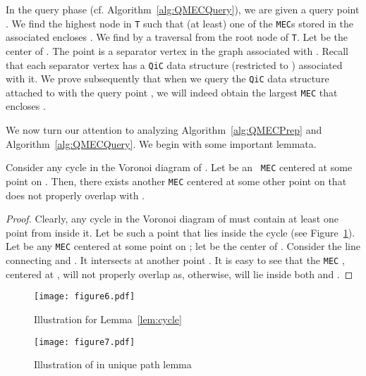 \documentclass[12pt]{llncs}
\begin{document}
In the query phase (cf. Algorithm\ \ref{alg:QMECQuery}), we are given a query point . We find the highest node  in {\tt T} such that (at least) one of the {\tt MEC}s  stored in the associated  encloses . We find  by a traversal from the root node of {\tt T}. Let  be the center of . The point  is a separator vertex in the graph  associated with . Recall that each separator vertex has a {\tt QiC} data structure (restricted to ) associated with it. We prove subsequently that when we query the {\tt QiC} data structure attached to  with the query point , we will indeed obtain the largest {\tt MEC}  that encloses . 

We now turn our attention to analyzing Algorithm\ \ref{alg:QMECPrep} and Algorithm\ \ref{alg:QMECQuery}. We begin with some important lemmata.

\begin{lemma}\label{lem:cycle} 
Consider any cycle  in the Voronoi diagram of . Let  be an {\tt 
MEC} centered at some point on . Then, there exists another {\tt MEC} 
 centered at some other point on  that does not properly overlap 
with . 
\end{lemma}
\begin{proof}
Clearly, any cycle in the Voronoi diagram of  must contain at 
least one point from  inside it. Let  be such a  point
that lies inside the cycle  (see Figure~\ref{fig:nspa}). Let 
be any {\tt MEC} centered at some point on ; let  be the center of .
Consider the line connecting  and . It intersects  at
another point . It is easy to see that the {\tt MEC} , centered
at , will not properly overlap  as, otherwise,
 will lie inside both  and . 
\end{proof}
\begin{figure}[h]
\begin{center} 
\texttt{[image: figure6.pdf]}\\

\end{center}

\caption{Illustration for Lemma~\ref{lem:cycle}}
\label{fig:nspa}
\end{figure}

\begin{figure}[h]
\begin{center} 
\texttt{[image: figure7.pdf]}\\
 \end{center}
\caption{Illustration of  in unique path lemma} 
\label{fig:nsp}
\end{figure}
\end{document}
